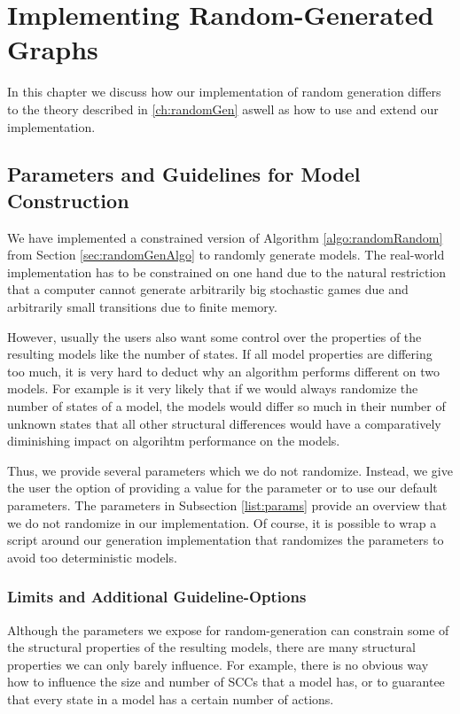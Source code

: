 \chapter{Implementing Random-Generated Graphs} \label{ch:implementedRandomGen}
In this chapter we discuss how our implementation of random generation differs to the theory described in \ref{ch:randomGen} aswell as how to use and extend our implementation. 

\section{Parameters and Guidelines for Model Construction} \label{sec:guidelines}
We have implemented a constrained version of Algorithm \ref{algo:randomRandom} from Section \ref{sec:randomGenAlgo} to randomly generate models.
The real-world implementation has to be constrained on one hand due to the natural restriction that a computer cannot generate arbitrarily big stochastic games due and 
arbitrarily small transitions due to finite memory.

However, usually the users also want some control over the properties of the resulting models like the number of states.
If all model properties are differing too much, it is very hard to deduct why an algorithm performs different on two models.
For example is it very likely that if we would always randomize the number of states of a model, the models would differ so much in their number of unknown states that all other structural differences 
would have a comparatively diminishing impact on algorihtm performance on the models.

Thus, we provide several parameters which we do not randomize. Instead, we give the user the option of providing a value for the parameter or to use our default parameters.
The parameters in Subsection \ref{list:params} provide an overview that we do not randomize in our implementation.
Of course, it is possible to wrap a script around our generation implementation that randomizes the parameters to avoid too deterministic models.

\subsection{Limits and Additional Guideline-Options}
Although the parameters we expose for random-generation can constrain some of the structural properties of the resulting models, 
there are many structural properties we can only barely influence. For example, there is no obvious way how to influence the size and number of SCCs that a model has, or to guarantee
that every state in a model has a certain number of actions.

